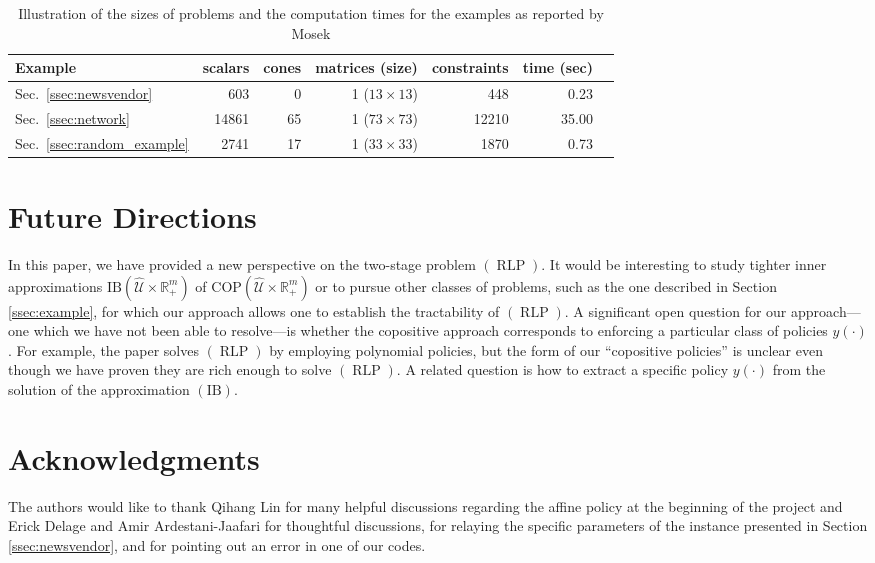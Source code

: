 \documentclass[12pt]{article}
\DeclareMathOperator{\AR}{RLP}
\newcommand{\K}{\widehat{\mathcal{U}}}
\newcommand{\COP}{{\mathrm{COP}}}
\newcommand{\IB}{\mathrm{IB}}
\def\RR{{\mathbb{R}}}
\newcommand{\Q}{{\K \times \RR^m_+}}
\begin{document}
\begin{onehalfspace}
\begin{table}[tbp]
\centering
\begin{tabular}{lrrrrrr}
Example & scalars & cones & matrices (size) & constraints & time (sec) \\ \hline
Sec.~\ref{ssec:newsvendor} & 603 & 0 & 1 ($13 \times 13$) & 448 & 0.23  \\
Sec.~\ref{ssec:network} & 14861 & 65 & 1 ($73 \times 73$) & 12210 & 35.00 \\
Sec.~\ref{ssec:random_example} & 2741 & 17 & 1 ($33 \times 33$) & 1870 &  0.73
\end{tabular}
\caption{Illustration of the sizes of problems and the computation times for the examples as reported by Mosek}
\label{Tab:statistics}
\end{table}


\section{Future Directions} \label{sec:future}

In this paper, we have provided a new perspective on the two-stage problem
$(\AR)$. It would be interesting to study tighter inner approximations
$\IB(\Q)$ of $\COP(\Q)$ or to pursue other classes of problems, such
as the one described in Section \ref{ssec:example}, for which our
approach allows one to establish the tractability of $(\AR)$. A
significant open question for our approach---one which we have not been
able to resolve---is whether the copositive approach corresponds to
enforcing a particular class of policies $y(\cdot)$. For example, the
paper \cite{Bertsimas.Iancu.Parrilo.2011} solves $(\AR)$ by employing
polynomial policies, but the form of our ``copositive policies'' is
unclear even though we have proven they are rich enough to solve
$(\AR)$. A related question is how to extract a specific policy
$y(\cdot)$ from the solution of the approximation $(\IB)$.

\section*{Acknowledgments}

The authors would like to thank Qihang Lin for many helpful discussions
regarding the affine policy at the beginning of the project and Erick
Delage and Amir Ardestani-Jaafari for thoughtful discussions, for
relaying the specific parameters of the instance presented in Section
\ref{ssec:newsvendor}, and for pointing out an error in one of our
codes.

\end{onehalfspace}
\end{document}
